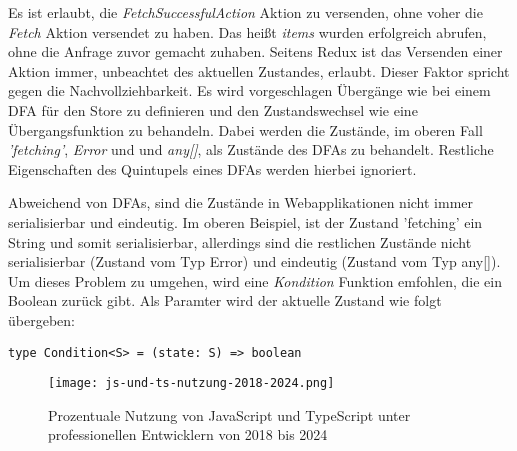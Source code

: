 Es ist erlaubt, die \textit{FetchSuccessfulAction} Aktion zu versenden, ohne voher die \textit{Fetch} Aktion versendet zu haben. Das heißt \textit{items} wurden erfolgreich abrufen, ohne die Anfrage zuvor gemacht zuhaben. Seitens Redux ist das Versenden einer Aktion immer, unbeachtet des aktuellen Zustandes, erlaubt. Dieser Faktor spricht gegen die Nachvollziehbarkeit. Es wird vorgeschlagen Übergänge wie bei einem DFA für den Store zu definieren und den Zustandswechsel wie eine Übergangsfunktion zu behandeln. Dabei werden die Zustände, im oberen Fall \textit{'fetching'}, \textit{Error} und und \textit{any[]}, als Zustände des DFAs zu behandelt. Restliche Eigenschaften des Quintupels eines DFAs werden hierbei ignoriert.

Abweichend von DFAs, sind die Zustände in Webapplikationen nicht immer serialisierbar und eindeutig. Im oberen Beispiel, ist der Zustand 'fetching' ein String und somit serialisierbar, allerdings sind die restlichen Zustände nicht serialisierbar (Zustand vom Typ Error) und eindeutig (Zustand vom Typ any[]). Um dieses Problem zu umgehen, wird eine \textit{Kondition} Funktion emfohlen, die ein Boolean zurück gibt. Als Paramter wird der aktuelle Zustand wie folgt übergeben:

\begin{lstlisting}
type Condition<S> = (state: S) => boolean
\end{lstlisting}




\begin{figure}[h!]
  \texttt{[image: js-und-ts-nutzung-2018-2024.png]}
  \caption{Prozentuale Nutzung von JavaScript und TypeScript unter professionellen Entwicklern von 2018 bis 2024}
  \label{fig:js-und-ts-nutzung-2018-2024}
\end{figure}

